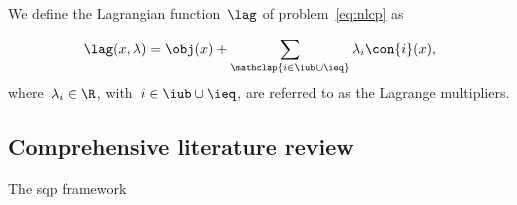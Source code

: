 We define the Lagrangian function~$\lag$ of problem~\eqref{eq:nlcp} as

\begin{equation}
    \label{eq:lag}
    \lag(x, \lambda) = \obj(x) + \sum_{\mathclap{i \in \iub \cup \ieq}} \lambda_i \con{i}(x),
\end{equation}
%
where~$\lambda_i \in \R$, with~$i \in \iub \cup \ieq$, are referred to as the Lagrange multipliers.

\subsection{Comprehensive literature review}

The \gls{sqp} framework~\cite{Han_1976,Han_1977,Powell_1978a,Powell_1978b,Wilson_1963}
